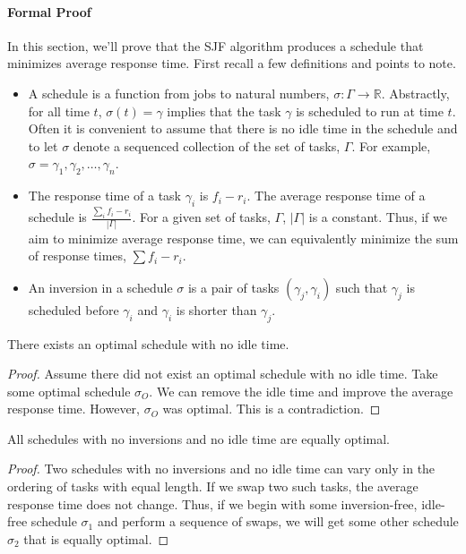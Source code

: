 \documentclass{hw}
\begin{document}
\paragraph{Formal Proof}
In this section, we'll prove that the SJF algorithm produces a schedule that
minimizes average response time. First recall a few definitions and points to
note.
\begin{itemize}
  \item A schedule is a function from jobs to natural numbers, $\sigma: \Gamma
    \rightarrow \mathbb{R}$. Abstractly, for all time $t$, $\sigma(t) = \gamma$
    implies that the task $\gamma$ is scheduled to run at time $t$. Often it is
    convenient to assume that there is no idle time in the schedule and to let
    $\sigma$ denote a sequenced collection of the set of tasks, $\Gamma$. For
    example, $\sigma = \gamma_1, \gamma_2, \ldots, \gamma_n$.
  \item The response time of a task $\gamma_i$ is $f_i - r_i$. The average
    response time of a schedule is $\frac{\sum_i f_i - r_i}{|\Gamma|}$. For a
    given set of tasks, $\Gamma$, $|\Gamma|$ is a constant. Thus, if we aim to
    minimize average response time, we can equivalently minimize the sum of
    response times, $\sum f_i - r_i$.
  \item An inversion in a schedule $\sigma$ is a pair of tasks $(\gamma_j,
    \gamma_i)$ such that $\gamma_j$ is scheduled before $\gamma_i$ and
    $\gamma_i$ is shorter than $\gamma_j$.
\end{itemize}

\begin{lemma}\label{lemma:idle}
There exists an optimal schedule with no idle time.
\begin{proof}
Assume there did not exist an optimal schedule with no idle time. Take some
optimal schedule $\sigma_O$. We can remove the idle time and improve the
average response time. However, $\sigma_O$ was optimal. This is a
contradiction.
\end{proof}
\end{lemma}

\begin{lemma}\label{lemma:equal}
All schedules with no inversions and no idle time are equally optimal.
\begin{proof}
Two schedules with no inversions and no idle time can vary only in the ordering
of tasks with equal length. If we swap two such tasks, the average response
time does not change. Thus, if we begin with some inversion-free, idle-free
schedule $\sigma_1$ and perform a sequence of swaps, we will get some other
schedule $\sigma_2$ that is equally optimal.
\end{proof}
\end{lemma}
\end{document}
